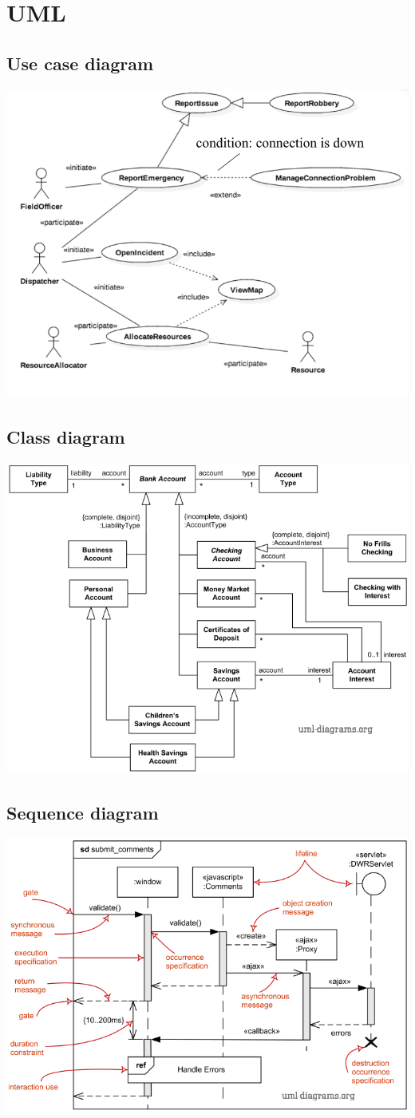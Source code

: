 \section{UML}
\subsection{Use case diagram}
\includegraphics[angle=90,origin=c,width=0.8\linewidth]{4-uml/use-case.png}

\subsection{Class diagram}
\includegraphics[angle=90,origin=c,width=0.8\linewidth]{4-uml/class.png}

\subsection{Sequence diagram}
\includegraphics[angle=90,origin=c,width=0.8\linewidth]{4-uml/sequence.png}

